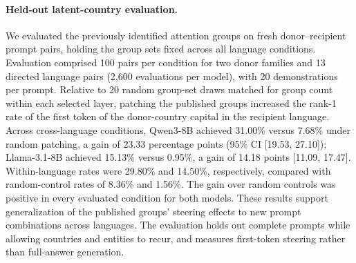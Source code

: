 \paragraph{Held-out latent-country evaluation.}
We evaluated the previously identified attention groups on fresh donor--recipient prompt pairs, holding the group sets fixed across all language conditions. Evaluation comprised 100 pairs per condition for two donor families and 13 directed language pairs (2,600 evaluations per model), with 20 demonstrations per prompt. Relative to 20 random group-set draws matched for group count within each selected layer, patching the published groups increased the rank-1 rate of the first token of the donor-country capital in the recipient language. Across cross-language conditions, Qwen3-8B achieved 31.00\% versus 7.68\% under random patching, a gain of 23.33 percentage points (95\% CI [19.53, 27.10]); Llama-3.1-8B achieved 15.13\% versus 0.95\%, a gain of 14.18 points [11.09, 17.47]. Within-language rates were 29.80\% and 14.50\%, respectively, compared with random-control rates of 8.36\% and 1.56\%. The gain over random controls was positive in every evaluated condition for both models. These results support generalization of the published groups' steering effects to new prompt combinations across languages. The evaluation holds out complete prompts while allowing countries and entities to recur, and measures first-token steering rather than full-answer generation.

